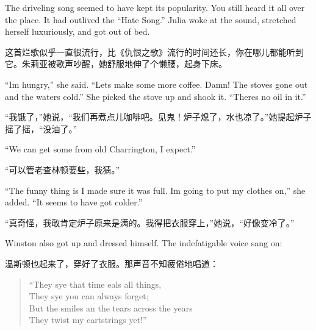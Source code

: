 \begin{paracol}{2}
\switchcolumn*

The driveling song seemed to have kept its popularity. You still heard
it all over the place. It had outlived the ``Hate Song.'' Julia woke at
the sound, stretched herself luxuriously, and got out of bed.

\switchcolumn

这首烂歌似乎一直很流行，比《仇恨之歌》流行的时间还长，你在哪儿都能听到它。朱莉亚被歌声吵醒，她舒服地伸了个懒腰，起身下床。

\switchcolumn*

``I\textquotesingle m hungry,'' she said. ``Let\textquotesingle s make some
more coffee. Damn! The stove\textquotesingle s gone out and the
water\textquotesingle s cold.'' She picked the stove up and shook it.
``There\textquotesingle s no oil in it.''

\switchcolumn

``我饿了，''她说，``我们再煮点儿咖啡吧。见鬼！炉子熄了，水也凉了。''她提起炉子摇了摇，``没油了。''

\switchcolumn*

``We can get some from old Charrington, I expect.''

\switchcolumn

``可以管老查林顿要些，我猜。''

\switchcolumn*

``The funny thing is I made sure it was full. I\textquotesingle m going
to put my clothes on,'' she added. ``It seems to have got colder.''

\switchcolumn

``真奇怪，我敢肯定炉子原来是满的。我得把衣服穿上，''她说，``好像变冷了。''

\switchcolumn*

Winston also got up and dressed himself. The indefatigable voice sang
on:

\switchcolumn

温斯顿也起来了，穿好了衣服。那声音不知疲倦地唱道：

\switchcolumn*

\begin{quotation}
  ``They sye that time \textquotesingle eals all things,\\
  They sye you can always forget;\\
  But the smiles an\textquotesingle{} the tears across the years\\
  They twist my \textquotesingle eartstrings yet!''
\end{quotation}


\end{paracol}
